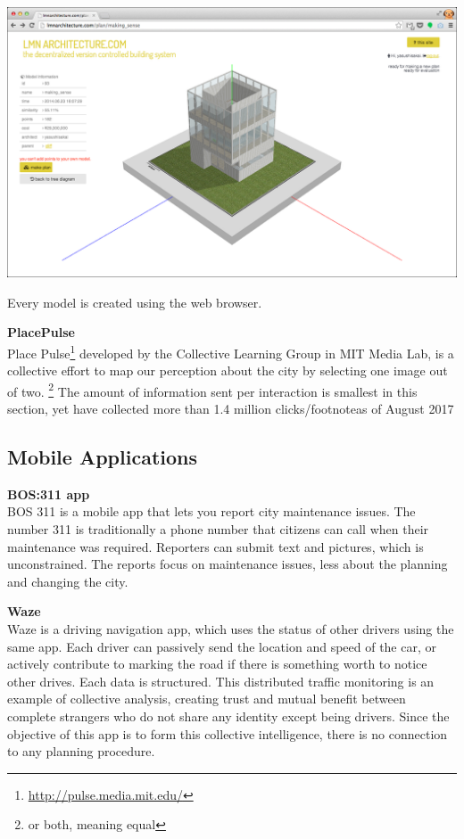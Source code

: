 \begin{marginfigure}[{0cm}]
  \includegraphics[width=\textwidth]{chapters/3/fig/lmn_006.png}               
  \caption[LMN: modeling inside the browser]{Every model is created using the web browser.}
  \label{fig:lnm_create}
\end{marginfigure}

\textbf{PlacePulse}\\
Place Pulse\footnote{\url{http://pulse.media.mit.edu/}}\cite{salesses2013collaborative} developed
by the Collective Learning Group in MIT Media Lab, is a collective effort
to map our perception about the city by selecting one image out of two.
\footnote{or both, meaning equal}
The amount of information sent per interaction is smallest in this section,
yet have collected more than 1.4 million clicks/footnote{as of August 2017}

\subsection{Mobile Applications}

\textbf{BOS:311 app}\\

BOS 311 is a mobile app that lets you report city maintenance issues. The
number 311 is traditionally a phone number that citizens can call when
their maintenance was required. Reporters can submit text and pictures,
which is unconstrained. The reports focus on maintenance issues, less about
the planning and changing the city.

\textbf{Waze}\\
Waze is a driving navigation app, which uses the status of other drivers
using the same app. Each driver can passively send the location and speed
of the car, or actively contribute to marking the road if there is
something worth to notice other drives. Each data is structured. 
This distributed traffic monitoring is an example of collective analysis,
creating trust and mutual benefit between complete strangers who do not
share any identity except being drivers.
Since the objective of this app is to form this collective intelligence,
there is no connection to any planning procedure.

